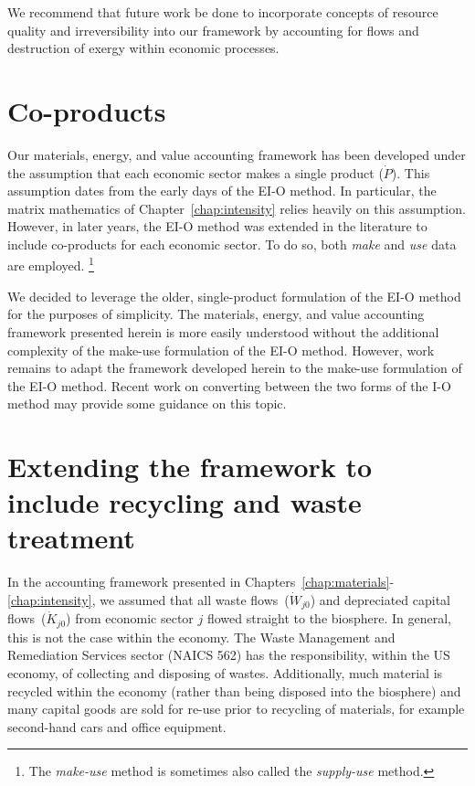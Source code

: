 \vspace{5 mm}

We recommend that future work be done to incorporate 
concepts of resource quality and irreversibility 
into our framework by accounting for flows and
destruction of exergy within economic processes.


\section{Co-products}
\label{sec:make-use}

Our materials, energy, and value accounting framework 
has been developed under the assumption 
that each economic sector makes a single product ($\dot{P}$).
This assumption dates from the early days of the EI-O method.\cite{Bullard-III:1975aa}
In particular, the matrix mathematics of Chapter~\ref{chap:intensity}
relies heavily on this assumption. 
However, in later years, the EI-O method was extended 
in the literature to include
co-products for each economic sector.\cite{Costanza:1984tq,Casler1984} 
To do so, both \emph{make} and \emph{use} data are employed.%
	\footnote{
	The \emph{make-use} method is sometimes also called the
	\emph{supply-use} method.
	}

We decided to leverage the older,
single-product formulation of the EI-O method
for the purposes of simplicity. 
The materials, energy, and value accounting framework
presented herein is more easily understood 
without the additional complexity of the make-use formulation 
of the EI-O method.
However, work remains to adapt the framework
developed herein to the make-use formulation of the EI-O method.
Recent work on converting between the two forms of the I-O method
may provide some guidance on this topic.\cite{Soklis:2009aa}

\section{Extending the framework to include recycling and waste treatment}
\label{sec:recycling_and_waste}

In the accounting framework presented in Chapters~\ref{chap:materials}-\ref{chap:intensity},
we assumed that all waste flows~($\dot{W}_{j0}$) and depreciated capital flows~($\dot{K}_{j0}$)
from economic sector $j$ flowed straight to the biosphere.
In general, this is not the case within the economy.
The Waste Management and Remediation Services sector (NAICS 562) has the responsibility,
within the US economy,
of collecting and disposing of wastes.
Additionally, much material is recycled within the economy 
(rather than being disposed into the biosphere)
and many capital goods are sold for re-use prior to recycling of materials,
for example second-hand cars and office equipment.

